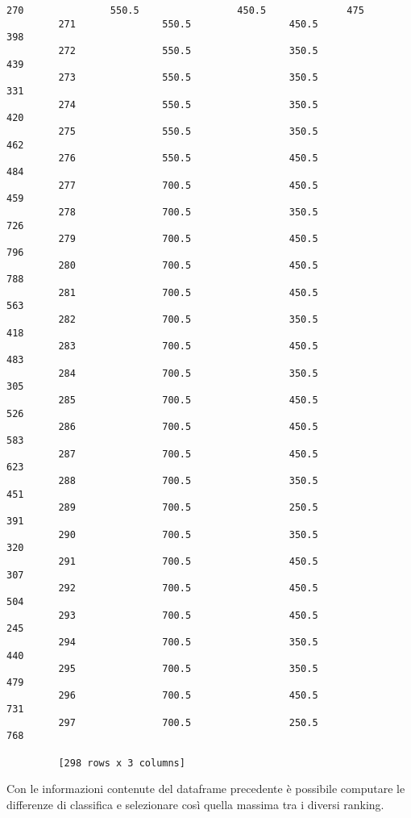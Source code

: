 \documentclass[11pt]{article}
\begin{document}
\begin{Verbatim}[commandchars=\\\{\}]
         270               550.5                 450.5              475
         271               550.5                 450.5              398
         272               550.5                 350.5              439
         273               550.5                 350.5              331
         274               550.5                 350.5              420
         275               550.5                 350.5              462
         276               550.5                 450.5              484
         277               700.5                 450.5              459
         278               700.5                 350.5              726
         279               700.5                 450.5              796
         280               700.5                 450.5              788
         281               700.5                 450.5              563
         282               700.5                 350.5              418
         283               700.5                 450.5              483
         284               700.5                 350.5              305
         285               700.5                 450.5              526
         286               700.5                 450.5              583
         287               700.5                 450.5              623
         288               700.5                 350.5              451
         289               700.5                 250.5              391
         290               700.5                 350.5              320
         291               700.5                 450.5              307
         292               700.5                 450.5              504
         293               700.5                 450.5              245
         294               700.5                 350.5              440
         295               700.5                 350.5              479
         296               700.5                 450.5              731
         297               700.5                 250.5              768
         
         [298 rows x 3 columns]
\end{Verbatim}
            
    Con le informazioni contenute del dataframe precedente è possibile
computare le differenze di classifica e selezionare così quella massima
tra i diversi ranking.
\end{document}
